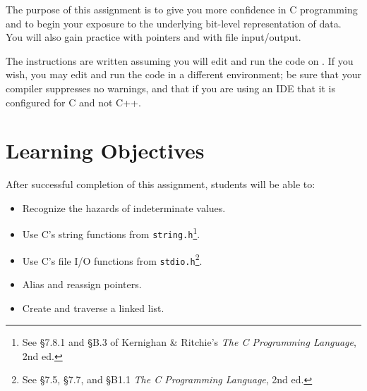 

\usepackage{graphicx}
\usepackage{caption}
\usepackage{wrapfig}
\usepackage{ulem}
\usepackage{cancel}
\usepackage{multicol}
\captionsetup{width=.8\linewidth}
\makeatletter
\let\orig@lstnumber=\thelstnumber

\newcommand\lstsetnumber[1]{\gdef\thelstnumber{#1}}
\newcommand\lstresetnumber{\global\let\thelstnumber=\orig@lstnumber}
\makeatother

\renewcommand{\labnumber}{3}
\renewcommand{\labname}{Pointer Manipulation Lab}
\renewcommand{\shortlabname}{pointerlab}
\renewcommand{\collaborationrules}{\individualeffort}
\renewcommand{\duedate}{Week of February 7, before the start of your lab section}

\newcommand{\cstwo}{CSCE~156, RAIK~184H, or SOFT~161}

\startdocument
% 

The purpose of this assignment is to give you more confidence in C programming
and to begin your exposure to the underlying bit-level representation of data.
You will also gain practice with pointers and with file input/output.

The instructions are written assuming you will edit and run the code on
\runtimeenvironment. If you wish, you may edit and run the code
in a different environment; be sure that your compiler suppresses no warnings,
and that if you are using an IDE that it is configured for C and not C++.

\section*{Learning Objectives}

After successful completion of this assignment, students will be able to:
\begin{itemize}
\item Recognize the hazards of indeterminate values.
\item Use C's string functions from \lstinline{string.h}\footnote{See \S7.8.1 and \S{}B.3 of Kernighan \& Ritchie's \textit{The C Programming Language}, 2nd ed.}.
\item Use C's file I/O functions from \lstinline{stdio.h}\footnote{See \S7.5, \S7.7, and \S{}B1.1 \textit{The C Programming Language}, 2nd ed.}.
\item Alias and reassign pointers.
\item Create and traverse a linked list.
\end{itemize}

